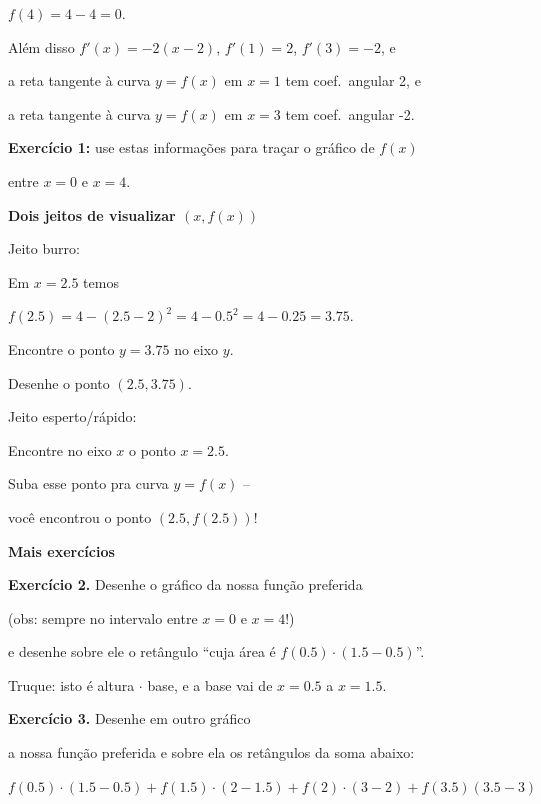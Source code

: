 \documentclass[oneside,12pt]{article}
\begin{document}
$f(4)=4-4=0$.

\msk

Além disso $f'(x) = -2(x-2)$, $f'(1)=2$, $f'(3)=-2$, e

a reta tangente à curva $y=f(x)$ em $x=1$ tem coef.\ angular 2, e

a reta tangente à curva $y=f(x)$ em $x=3$ tem coef.\ angular -2.

\msk

{\bf Exercício 1:} use estas informações para traçar o gráfico de $f(x)$

entre $x=0$ e $x=4$.


\newpage


{\bf Dois jeitos de visualizar $(x,f(x))$}

Jeito burro:

Em $x=2.5$ temos

$f(2.5) = 4 - (2.5-2)^2 = 4 - 0.5^2 = 4-0.25 = 3.75$.

Encontre o ponto $y=3.75$ no eixo $y$.

Desenhe o ponto $(2.5,3.75)$.

\msk

Jeito esperto/rápido:

Encontre no eixo $x$ o ponto $x=2.5$.

Suba esse ponto pra curva $y=f(x)$ --

você encontrou o ponto $(2.5,f(2.5))$!


\newpage


{\bf Mais exercícios}

{\bf Exercício 2.} Desenhe o gráfico da nossa função preferida

(obs: sempre no intervalo entre $x=0$ e $x=4$!)

e desenhe sobre ele o retângulo ``cuja área é $f(0.5)·(1.5-0.5)$''.

Truque: isto é altura $·$ base, e a base vai de $x=0.5$ a $x=1.5$.

\msk

{\bf Exercício 3.} Desenhe em outro gráfico

a nossa função preferida e sobre ela os retângulos da soma abaixo:

$f(0.5)·(1.5-0.5) + f(1.5)·(2-1.5) + f(2)·(3-2) + f(3.5)(3.5-3)$
\end{document}
